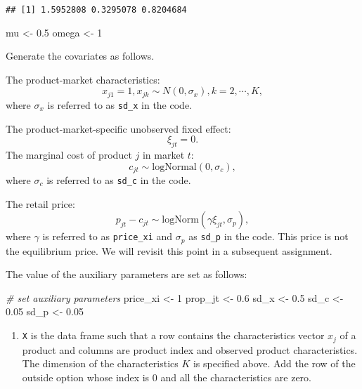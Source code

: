 \documentclass[
]{book}
\newenvironment{Shaded}{\begin{snugshade}}{\end{snugshade}}
\newcommand{\CommentTok}[1]{\textcolor[rgb]{0.56,0.35,0.01}{\textit{#1}}}
\newcommand{\DecValTok}[1]{\textcolor[rgb]{0.00,0.00,0.81}{#1}}
\newcommand{\FloatTok}[1]{\textcolor[rgb]{0.00,0.00,0.81}{#1}}
\newcommand{\NormalTok}[1]{#1}
\newcommand{\StringTok}[1]{\textcolor[rgb]{0.31,0.60,0.02}{#1}}
\providecommand{\tightlist}{%
  \setlength{\itemsep}{0pt}\setlength{\parskip}{0pt}}
\begin{document}
\begin{verbatim}
## [1] 1.5952808 0.3295078 0.8204684
\end{verbatim}

\begin{Shaded}
\begin{Highlighting}[]
\NormalTok{mu <-}\StringTok{ }\FloatTok{0.5}
\NormalTok{omega <-}\StringTok{ }\DecValTok{1}
\end{Highlighting}
\end{Shaded}

Generate the covariates as follows.

The product-market characteristics:
\[
x_{j1} = 1, x_{jk} \sim N(0, \sigma_x), k = 2, \cdots, K,
\]
where \(\sigma_x\) is referred to as \texttt{sd\_x} in the code.

The product-market-specific unobserved fixed effect:
\[
\xi_{jt} = 0.
\]
The marginal cost of product \(j\) in market \(t\):
\[
c_{jt} \sim \text{logNormal}(0, \sigma_c),
\]
where \(\sigma_c\) is referred to as \texttt{sd\_c} in the code.

The retail price:
\[
p_{jt} - c_{jt} \sim \text{logNorm}(\gamma \xi_{jt}, \sigma_p),
\]
where \(\gamma\) is referred to as \texttt{price\_xi} and \(\sigma_p\) as \texttt{sd\_p} in the code. This price is not the equilibrium price. We will revisit this point in a subsequent assignment.

The value of the auxiliary parameters are set as follows:

\begin{Shaded}
\begin{Highlighting}[]
\CommentTok{# set auxiliary parameters}
\NormalTok{price_xi <-}\StringTok{ }\DecValTok{1}
\NormalTok{prop_jt <-}\StringTok{ }\FloatTok{0.6}
\NormalTok{sd_x <-}\StringTok{ }\FloatTok{0.5}
\NormalTok{sd_c <-}\StringTok{ }\FloatTok{0.05}
\NormalTok{sd_p <-}\StringTok{ }\FloatTok{0.05}
\end{Highlighting}
\end{Shaded}

\begin{enumerate}
\def\labelenumi{\arabic{enumi}.}
\setcounter{enumi}{1}
\tightlist
\item
  \texttt{X} is the data frame such that a row contains the characteristics vector \(x_{j}\) of a product and columns are product index and observed product characteristics. The dimension of the characteristics \(K\) is specified above. Add the row of the outside option whose index is \(0\) and all the characteristics are zero.
\end{enumerate}
\end{document}
